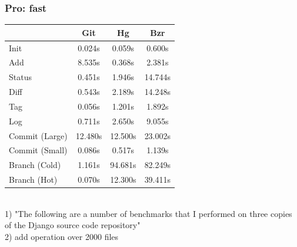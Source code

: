 \documentclass{beamer}
\begin{document}
		\begin{frame}
			\frametitle{Pro: fast}
			\begin{center}
				\begin{tabular}{ l  c  c  c }
				    \hline
						& Git & Hg & Bzr \\ \hline
						Init & \cellcolor{green!25} 0.024s & 0.059s & 0.600s \\ \hline
						Add & 8.535s & \cellcolor{green!25} 0.368s & 2.381s \\ \hline
						Status & \cellcolor{green!25} 0.451s & 1.946s & 14.744s \\ \hline
						Diff & \cellcolor{green!25} 0.543s & 2.189s & 14.248s \\ \hline
						Tag & \cellcolor{green!25} 0.056s & 1.201s & 1.892s \\ \hline
						Log & \cellcolor{green!25} 0.711s & 2.650s & 9.055s \\ \hline
						Commit (Large) & \cellcolor{green!25} 12.480s & 12.500s & 23.002s \\ \hline
						Commit (Small) & \cellcolor{green!25} 0.086s & 0.517s & 1.139s \\ \hline
						Branch (Cold) & \cellcolor{green!25} 1.161s & 94.681s & 82.249s \\ \hline
						Branch (Hot) & \cellcolor{green!25} 0.070s & 12.300s & 39.411s \\ \hline
				\end{tabular}
				\\ 
				1) "The following are a number of benchmarks that I performed on three copies of the Django source code repository" \\
				2) add operation over 2000 files
			\end{center}
		\end{frame}
		
\end{document}
